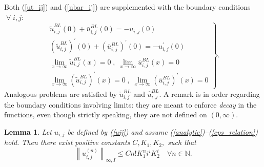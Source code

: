 \documentclass[10pt,a4paper]{amsart}
\newtheorem{lemma}{Lemma}
\begin{document}
%
Both (\ref{ut_ij}) and (\ref{ubar_ij}) are supplemented with the boundary
conditions$\;\forall \;i,j:$
%
\begin{equation}
\left. 
\begin{array}{c}
\tilde{u}^{BL}_{i,j}(0)+\bar{u}^{BL}_{i,j}(0)=-u_{i,j}(0) \\ 
\left(\tilde{u}^{BL}_{i,j}\right)^{\prime }(0)+\left(\bar{u}^{BL}_{i,j}\right)^{\prime }(0)=-u_{i,j}^{\prime }(0)
\\ 
\lim_{x\rightarrow \infty }\tilde{u}^{BL}_{i,j}(x)=0 \; , \; \lim_{x\rightarrow \infty }\bar{u}^{BL}_{i,j}(x)=0 \\
\lim_{x\rightarrow \infty }\left(\tilde{u}^{BL}_{i,j}\right)^{\prime }(x)=0 \; , \; \lim_{x\rightarrow \infty }\left(\bar{u}^{BL}_{i,j}\right)^{\prime }(x)=0
\end{array}
%
\right\} .  \label{bcBL}
\end{equation}
%
Analogous problems are satisfied by $\check{u}^{BL}_{i,j}$ and $\hat{u}^{BL}_{i,j}$. A remark is in order regarding the boundary conditions involving limits: they are meant to enforce \emph{decay} in the functions, even though strictly speaking, they are not defined on $(0, \infty)$.

\begin{lemma}\label{lem:u_n_ij}
Let $u_{i,j}$ be defined by (\ref{uij}) and assume  (\ref{analytic})--(\ref{eps_relation}) hold. Then there exist
positive constants $C, K_1, K_2,$ such that
%
\begin{equation}
\left\|u_{i, j}^{(n)}\right\|_{\infty, I} \leq C n ! K_1^n i^i K_2^i \quad \forall n \in \mathbb{N} .
\end{equation}
%
\end{lemma}
\end{document}
